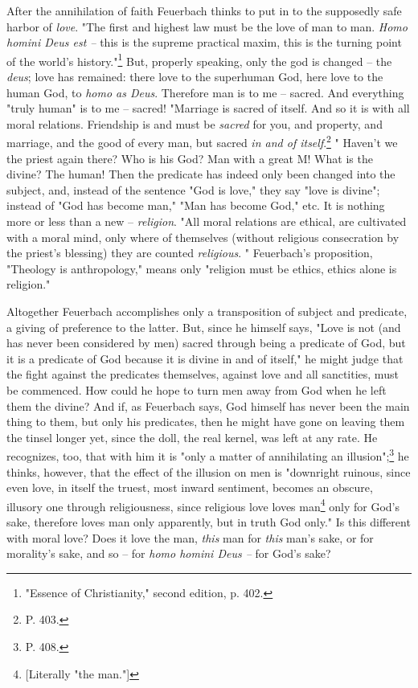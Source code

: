 \documentclass[a4paper]{book}
\begin{document}
After the annihilation of faith Feuerbach thinks to put in to the supposedly 
safe harbor of \textit{love}. "{}The first and highest law must be the love of 
man to man. \textit{Homo homini Deus est --} this is the supreme practical 
maxim, this is the turning point of the world's 
history."{}\footnote{"{}Essence of Christianity,"{} second edition, p. 402.} 
But, properly speaking, only the god is changed -- the \textit{deus}; love has 
remained: there love to the superhuman God, here love to the human God, to 
\textit{homo as Deus}. Therefore man is to me -- sacred. And everything 
"{}truly human"{} is to me -- sacred! "{}Marriage is sacred of itself. And so 
it is with all moral relations. Friendship is and must be \textit{sacred} for 
you, and property, and marriage, and the good of every man, but sacred 
\textit{in and of itself}.\footnote{P. 403.} "{} Haven't we the priest again 
there? Who is his God? Man with a great M! What is the divine? The human! Then 
the predicate has indeed only been changed into the subject, and, instead of 
the sentence "{}God is love,"{} they say "{}love is divine"{}; instead of 
"{}God has become man,"{} "{}Man has become God,"{} etc. It is nothing more or 
less than a new -- \textit{religion}. "{}All moral relations are ethical, are 
cultivated with a moral mind, only where of themselves (without religious 
consecration by the priest's blessing) they are counted \textit{religious}. 
"{} Feuerbach's proposition, "{}Theology is anthropology,"{} means only 
"{}religion must be ethics, ethics alone is religion."{}

Altogether Feuerbach accomplishes only a transposition of subject and 
predicate, a giving of preference to the latter. But, since he himself says, 
"{}Love is not (and has never been considered by men) sacred through being a 
predicate of God, but it is a predicate of God because it is divine in and of 
itself,"{} he might judge that the fight against the predicates themselves, 
against love and all sanctities, must be commenced. How could he hope to turn 
men away from God when he left them the divine? And if, as Feuerbach says, God 
himself has never been the main thing to them, but only his predicates, then 
he might have gone on leaving them the tinsel longer yet, since the doll, the 
real kernel, was left at any rate. He recognizes, too, that with him it is 
"{}only a matter of annihilating an illusion"{};\footnote{P. 408.} he thinks, 
however, that the effect of the illusion on men is "{}downright ruinous, since 
even love, in itself the truest, most inward sentiment, becomes an obscure, 
illusory one through religiousness, since religious love loves 
man\footnote{[Literally "{}the man."{}]} only for God's sake, therefore loves 
man only apparently, but in truth God only."{} Is this different with moral 
love? Does it love the man, \textit{this} man for \textit{this} man's sake, or 
for morality's sake, and so -- for \textit{homo homini Deus --} for God's 
sake?
\end{document}
